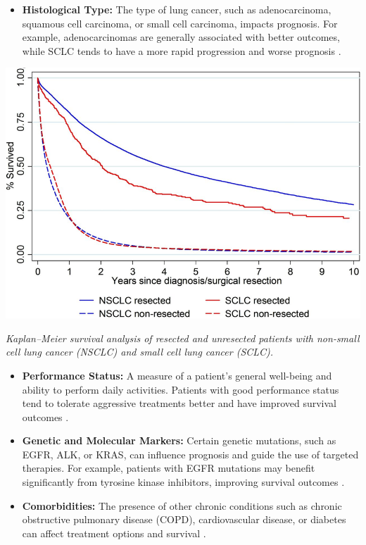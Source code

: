 \begin{itemize}
    \item \textbf{Histological Type:} The type of lung cancer, such as adenocarcinoma, squamous cell 
    carcinoma, or small cell carcinoma, impacts prognosis. For example, adenocarcinomas are 
    generally associated with better outcomes, while SCLC tends to have a more rapid progression and 
    worse prognosis \cite{travis2015classification}.
\end{itemize}

\vspace{1em}
\begin{center}
    \includegraphics[width=1.00\textwidth]{../assets/05-prognosis/histological-type-survival.png}

    \small\textit{Kaplan–Meier survival analysis of resected and unresected patients with non-small 
    cell lung cancer (NSCLC) and small cell lung cancer (SCLC). \cite{article}}
\end{center}
\vspace{1em}

\begin{itemize}
    \item \textbf{Performance Status:} A measure of a patient’s general well-being and ability to 
    perform daily activities. Patients with good performance status tend to tolerate aggressive 
    treatments better and have improved survival outcomes \cite{basch2016symptoms}.

    \item \textbf{Genetic and Molecular Markers:} Certain genetic mutations, such as EGFR, ALK, or 
    KRAS, can influence prognosis and guide the use of targeted therapies. For example, patients 
    with EGFR mutations may benefit significantly from tyrosine kinase inhibitors, improving 
    survival outcomes \cite{molecular2023}.

    \item \textbf{Comorbidities:} The presence of other chronic conditions such as chronic 
    obstructive pulmonary disease (COPD), cardiovascular disease, or diabetes can affect treatment 
    options and survival \cite{copdlungcancer}.
\end{itemize}

